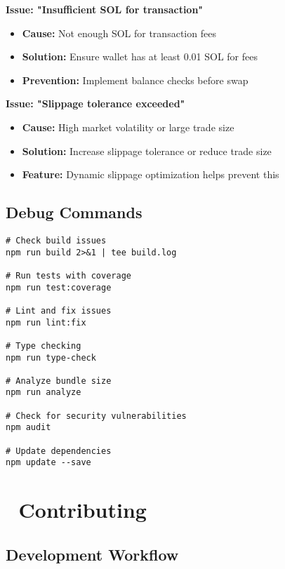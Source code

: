 \documentclass[11pt,a4paper]{article}
\begin{document}
\begin{tcolorbox}[colback=warningOrange!10,colframe=warningOrange]
\textbf{Issue: "Insufficient SOL for transaction"}
\begin{itemize}
    \item \textbf{Cause:} Not enough SOL for transaction fees
    \item \textbf{Solution:} Ensure wallet has at least 0.01 SOL for fees
    \item \textbf{Prevention:} Implement balance checks before swap
\end{itemize}
\end{tcolorbox}

\begin{tcolorbox}[colback=warningOrange!10,colframe=warningOrange]
\textbf{Issue: "Slippage tolerance exceeded"}
\begin{itemize}
    \item \textbf{Cause:} High market volatility or large trade size
    \item \textbf{Solution:} Increase slippage tolerance or reduce trade size
    \item \textbf{Feature:} Dynamic slippage optimization helps prevent this
\end{itemize}
\end{tcolorbox}

\subsection{Debug Commands}

\begin{lstlisting}[style=bash, caption=Debugging Commands]
# Check build issues
npm run build 2>&1 | tee build.log

# Run tests with coverage
npm run test:coverage

# Lint and fix issues
npm run lint:fix

# Type checking
npm run type-check

# Analyze bundle size
npm run analyze

# Check for security vulnerabilities
npm audit

# Update dependencies
npm update --save
\end{lstlisting}

\section{🤝 Contributing}

\subsection{Development Workflow}
\end{document}
